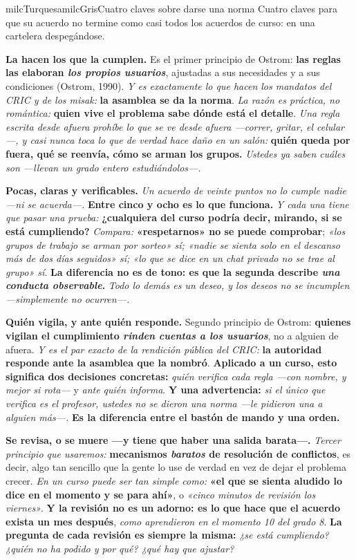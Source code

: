 \documentclass[11pt,letterpaper]{article}
\newcommand{\milcpaso}[3]{%
\Needspace{4\baselineskip}%
\begin{tcolorbox}[enhanced,colback=white,colframe=milcLinea,arc=1.5mm,boxrule=.9pt,
  left=14mm,right=4mm,top=3mm,bottom=3mm,before skip=4pt,after skip=4pt,
  fontupper=\RaggedRight,
  overlay={\node[anchor=north west,circle,fill=#2,text=white,inner sep=0pt,
    minimum size=7.4mm,font=\sffamily\bfseries\small]
    at ([xshift=3.6mm,yshift=-3.2mm]frame.north west) {#1};}]
#3
\end{tcolorbox}}
\begin{document}
\begin{softbox}{milcTurquesa}{milcGris}{Cuatro claves sobre darse una norma}
Cuatro claves para que su acuerdo no termine como casi todos los acuerdos de curso: en una cartelera despegándose.
\end{softbox}

\milcpaso{1}{milcTurquesa}{\textbf{La hacen los que la cumplen.} Es el primer principio de Ostrom: \textbf{las reglas las elaboran \emph{los propios usuarios}}, ajustadas a sus necesidades y a sus condiciones (Ostrom, 1990). \emph{Y es exactamente lo que hacen los mandatos del CRIC y de los misak:} \textbf{la asamblea se da la norma}. \emph{La razón es práctica, no romántica:} \textbf{quien vive el problema sabe dónde está el detalle}. \emph{Una regla escrita desde afuera prohíbe lo que se ve desde afuera ---correr, gritar, el celular---, y casi nunca toca lo que de verdad hace daño en un salón:} \textbf{quién queda por fuera, qué se reenvía, cómo se arman los grupos.} \emph{Ustedes ya saben cuáles son ---llevan un grado entero estudiándolos---.}}
\milcpaso{2}{milcTurquesa}{\textbf{Pocas, claras y verificables.} \emph{Un acuerdo de veinte puntos no lo cumple nadie ---ni se acuerda---.} \textbf{Entre cinco y ocho es lo que funciona.} \emph{Y cada una tiene que pasar una prueba:} \textbf{¿cualquiera del curso podría decir, mirando, si se está cumpliendo?} \emph{Compara:} \textbf{«respetarnos» no se puede comprobar}; \emph{«los grupos de trabajo se arman por sorteo» sí; «nadie se sienta solo en el descanso más de dos días seguidos» sí; «lo que se dice en un chat privado no se trae al grupo» sí}. \textbf{La diferencia no es de tono: es que la segunda describe \emph{una conducta observable}.} \emph{Todo lo demás es un deseo, y los deseos no se incumplen ---simplemente no ocurren---.}}
\milcpaso{3}{milcTurquesa}{\textbf{Quién vigila, y ante quién responde.} Segundo principio de Ostrom: \textbf{quienes vigilan el cumplimiento \emph{rinden cuentas a los usuarios}}, no a alguien de afuera. \emph{Y es el par exacto de la rendición pública del CRIC:} \textbf{la autoridad responde ante la asamblea que la nombró}. \textbf{Aplicado a un curso, esto significa dos decisiones concretas:} \emph{quién verifica cada regla ---con nombre, y mejor si rota---} y \emph{ante quién informa}. \textbf{Y una advertencia:} \emph{si el único que verifica es el profesor, ustedes no se dieron una norma ---le pidieron una a alguien más---.} \textbf{Es la diferencia entre el bastón de mando y una orden.}}
\milcpaso{4}{milcTurquesa}{\textbf{Se revisa, o se muere ---y tiene que haber una salida barata---.} \emph{Tercer principio que usaremos:} \textbf{mecanismos \emph{baratos} de resolución de conflictos}, es decir, algo tan sencillo que la gente lo use de verdad en vez de dejar el problema crecer. \emph{En un curso puede ser tan simple como:} \textbf{«el que se sienta aludido lo dice en el momento y se para ahí»}, o \emph{«cinco minutos de revisión los viernes»}. \textbf{Y la revisión no es un adorno: es lo que hace que el acuerdo exista un mes después}, \emph{como aprendieron en el momento 10 del grado 8}. \textbf{La pregunta de cada revisión es siempre la misma:} \emph{¿se está cumpliendo? ¿quién no ha podido y por qué? ¿qué hay que ajustar?}}
\end{document}
